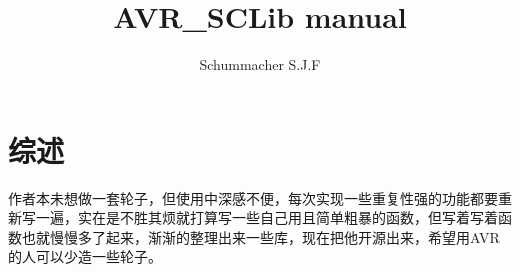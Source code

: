 \documentclass{article}
\title{AVR\_SCLib manual}
\begin{document}
\author{Schummacher S.J.F}
\maketitle
\newpage
\tableofcontents
\newpage
\section{综述}作者本未想做一套轮子，但使用中深感不便，每次实现一些重复性强的功能都要重新写一遍，实在是不胜其烦就打算写一些自己用且简单粗暴的函数，但写着写着函数也就慢慢多了起来，渐渐的整理出来一些库，现在把他开源出来，希望用AVR的人可以少造一些轮子。
\end{document}
